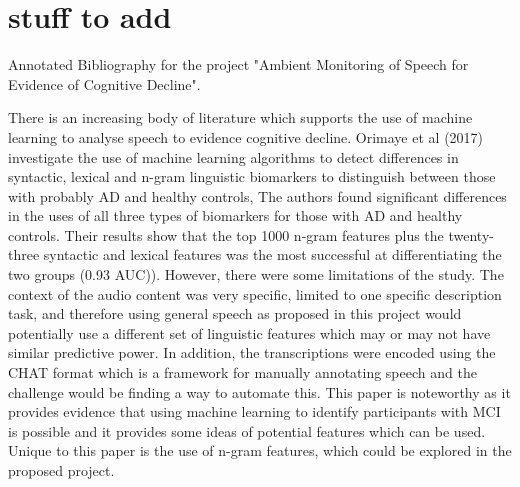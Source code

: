 \documentclass[a4paper]{article}
\begin{document}
\section{stuff to add}
Annotated Bibliography for the project "Ambient Monitoring of Speech for Evidence of Cognitive Decline".
\newline
\par 
There is an increasing body of literature which supports the use of machine learning to analyse speech to evidence cognitive decline. Orimaye et al (2017) investigate the use of machine learning algorithms to detect differences in syntactic, lexical and n-gram linguistic biomarkers to distinguish between those with probably AD and healthy controls, The authors found significant differences in the uses of all three types of biomarkers for those with AD and healthy controls. Their results show that the top 1000 n-gram features plus the twenty-three syntactic and lexical features was the most successful at differentiating the two groups (0.93 AUC)). However, there were some limitations of the study. The context of the audio content was very specific, limited to one specific description task, and therefore using general speech as proposed in this project would potentially use a different set of linguistic features which may or may not have similar predictive power. In addition, the transcriptions were encoded using the CHAT format which is a framework for manually annotating speech and the challenge would be finding a way to automate this. This paper is noteworthy as it provides evidence that using machine learning to identify participants with MCI is possible and it provides some ideas of potential features which can be used. Unique to this paper is the use of n-gram features, which could be explored in the proposed project.
\newline
\par
\end{document}
